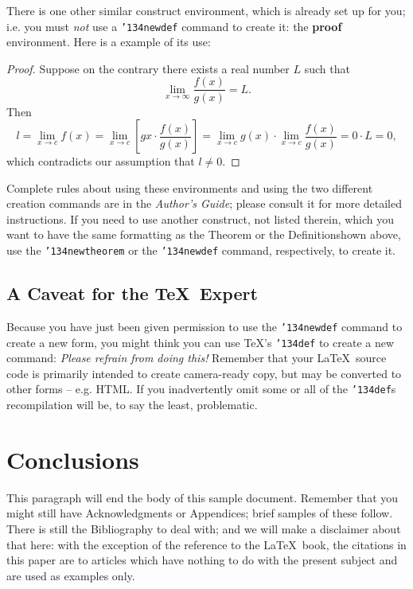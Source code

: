 \documentclass{sig-alternate}
\begin{document}
There is one other similar construct environment, which is
already set up
for you; i.e. you must \textit{not} use
a \texttt{{\char'134}newdef} command to
create it: the \textbf{proof} environment.  Here
is a example of its use:
\begin{proof}
Suppose on the contrary there exists a real number $L$ such that
\begin{displaymath}
\lim_{x\rightarrow\infty} \frac{f(x)}{g(x)} = L.
\end{displaymath}
Then
\begin{displaymath}
l=\lim_{x\rightarrow c} f(x)
= \lim_{x\rightarrow c}
\left[ g{x} \cdot \frac{f(x)}{g(x)} \right ]
= \lim_{x\rightarrow c} g(x) \cdot \lim_{x\rightarrow c}
\frac{f(x)}{g(x)} = 0\cdot L = 0,
\end{displaymath}
which contradicts our assumption that $l\neq 0$.
\end{proof}

Complete rules about using these environments and using the
two different creation commands are in the
\textit{Author's Guide}; please consult it for more
detailed instructions.  If you need to use another construct,
not listed therein, which you want to have the same
formatting as the Theorem
or the Definitionshown above,
use the \texttt{{\char'134}newtheorem} or the
\texttt{{\char'134}newdef} command,
respectively, to create it.

\subsection*{A {\secit Caveat} for the \TeX\ Expert}
Because you have just been given permission to
use the \texttt{{\char'134}newdef} command to create a
new form, you might think you can
use \TeX's \texttt{{\char'134}def} to create a
new command: \textit{Please refrain from doing this!}
Remember that your \LaTeX\ source code is primarily intended
to create camera-ready copy, but may be converted
to other forms -- e.g. HTML. If you inadvertently omit
some or all of the \texttt{{\char'134}def}s recompilation will
be, to say the least, problematic.

\section{Conclusions}
This paragraph will end the body of this sample document.
Remember that you might still have Acknowledgments or
Appendices; brief samples of these
follow.  There is still the Bibliography to deal with; and
we will make a disclaimer about that here: with the exception
of the reference to the \LaTeX\ book, the citations in
this paper are to articles which have nothing to
do with the present subject and are used as
examples only.
\end{document}
